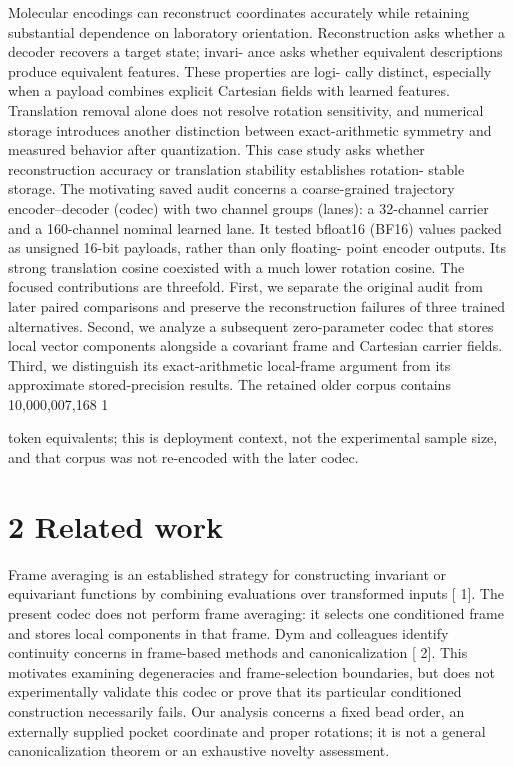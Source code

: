 \documentclass[11pt]{article}
\begin{document}
Molecular encodings can reconstruct coordinates accurately while retaining substantial dependence
on laboratory orientation. Reconstruction asks whether a decoder recovers a target state; invari-
ance asks whether equivalent descriptions produce equivalent features. These properties are logi-
cally distinct, especially when a payload combines explicit Cartesian fields with learned features.
Translation removal alone does not resolve rotation sensitivity, and numerical storage introduces
another distinction between exact-arithmetic symmetry and measured behavior after quantization.
This case study asks whether reconstruction accuracy or translation stability establishes rotation-
stable storage. The motivating saved audit concerns a coarse-grained trajectory encoder–decoder
(codec) with two channel groups (lanes): a 32-channel carrier and a 160-channel nominal learned
lane. It tested bfloat16 (BF16) values packed as unsigned 16-bit payloads, rather than only floating-
point encoder outputs. Its strong translation cosine coexisted with a much lower rotation cosine.
The focused contributions are threefold. First, we separate the original audit from later paired
comparisons and preserve the reconstruction failures of three trained alternatives. Second, we
analyze a subsequent zero-parameter codec that stores local vector components alongside a covariant
frame and Cartesian carrier fields. Third, we distinguish its exact-arithmetic local-frame argument
from its approximate stored-precision results. The retained older corpus contains 10,000,007,168
1

token equivalents; this is deployment context, not the experimental sample size, and that corpus
was not re-encoded with the later codec.

\section*{2 Related work}

Frame averaging is an established strategy for constructing invariant or equivariant functions by
combining evaluations over transformed inputs [ 1]. The present codec does not perform frame
averaging: it selects one conditioned frame and stores local components in that frame.
Dym and colleagues identify continuity concerns in frame-based methods and canonicalization [ 2].
This motivates examining degeneracies and frame-selection boundaries, but does not experimentally
validate this codec or prove that its particular conditioned construction necessarily fails. Our
analysis concerns a fixed bead order, an externally supplied pocket coordinate and proper rotations;
it is not a general canonicalization theorem or an exhaustive novelty assessment.
\end{document}
